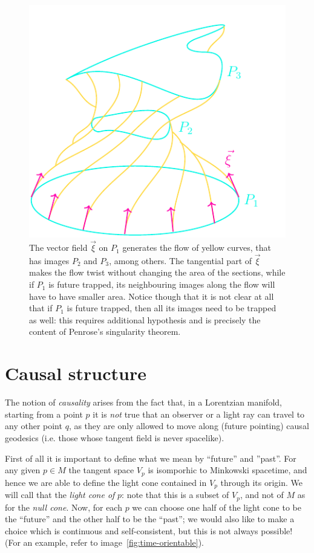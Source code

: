 	\begin{figure}
		\caption[]{The vector field \(\vec{\xi}\) on \(P_1\) generates the flow of yellow curves, that has images \(P_2\) and \(P_3\), among others. The tangential part of \(\vec{\xi}\) makes the flow twist without changing the area of the sections, while if \(P_1\) is future trapped, its neighbouring images along the flow will have to have smaller area. Notice though that it is not clear at all that if \(P_1\) is future trapped, then all its images need to be trapped as well: this requires additional hypothesis and is precisely the content of Penrose's singularity theorem.}
		\label{fig:area-and-curvature}
		\centering
		\includegraphics[scale=1]{Immagini/area-and-curvature/area-and-curvature.pdf}
	\end{figure}


\section{Causal structure}

The notion of \emph{causality} arises from the fact that, in a Lorentzian manifold, starting from a  point \(p\) it is \emph{not} true that an observer or a light ray can travel to any other point \(q\), as they are only allowed to move along (future pointing) causal geodesics (i.e. those whose tangent field is never spacelike).

First of all it is important to define what we mean by ``future'' and ''past''. For any given \(p\in M\) the tangent space \(V_p\) is isomporhic to Minkowski spacetime, and hence we are able to define the light cone contained in \(V_p\) through its origin. We will call that the \emph{light cone of} \(p\): note that this is a subset of \(V_p\), and not of \(M\) as for the \emph{null cone}.
Now, for each \(p\) we can choose one half of the light cone to be the ``future'' and the other half to be the ``past''; we would also like to make a choice which is continuous and self-consistent, but this is not always possible! (For an example, refer to image~\ref{fig:time-orientable}).

